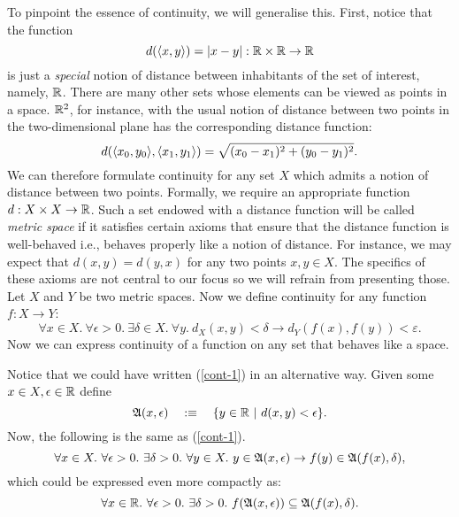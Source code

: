 To pinpoint the essence of continuity, we will generalise this. First, notice that the
function
\begin{equation*}
  d(\langle x , y \rangle) = | x - y | : \mathbb{R}{} \times \mathbb{R}{} \rightarrow \mathbb{R}{}
\end{equation*}
is just a \emph{special} notion of distance between inhabitants of the set of interest,
namely, $\mathbb{R}{}$. There are many other sets whose elements can be viewed as points in a
space. $\mathbb{R}{}^2$, for instance, with the usual notion of distance between two points in
the two-dimensional plane has the corresponding distance function:
\begin{equation*}
  d(\langle x_0 , y_0 \rangle , \langle x_1 , y_1 \rangle) = \sqrt{(x_0 - x_1)^2 + (y_0 - y_1)^2}.
\end{equation*}
We can therefore formulate continuity for any set $X$ which admits a notion of distance
between two points. Formally, we require an appropriate function $d : X \times X \rightarrow \mathbb{R}{}$.
Such a set endowed with a distance function will be called \emph{metric space} if it
satisfies certain axioms that ensure that the distance function is well-behaved i.e.,
behaves properly like a notion of distance. For instance, we may expect that $d(x, y) =
d(y, x)$ for any two points $x, y \in X$. The specifics of these axioms are not central to
our focus so we will refrain from presenting those. Let $X$ and $Y$ be two metric spaces.
Now we define continuity for any function $f : X \rightarrow Y$:
\begin{equation}\label{cont-1}
  \forall x \in X.~ \forall \epsilon > 0.~ \exists \delta \in X.~ \forall y.~ d_X(x, y) < δ \rightarrow d_Y(f(x), f(y)) < ε.
\end{equation}
Now we can express continuity of a function on any set that behaves like a space.

Notice that we could have written (\ref{cont-1}) in an alternative way. Given
some $x \in X, \epsilon \in \mathbb{R}{}$ define
\begin{equation*}
  \mathfrak{A}(x, \epsilon) \quad:\equiv\quad \{ y \in \mathbb{R}{}~|~d(x, y) < \epsilon \}.
\end{equation*}
Now, the following is the same as (\ref{cont-1}).
\begin{equation*}
  \forall x \in X.~ \forall \epsilon > 0.~ \exists \delta > 0.~ \forall y \in X.~ y \in \mathfrak{A}(x, \epsilon) \rightarrow f(y) \in \mathfrak{A}(f(x), \delta),
\end{equation*}
which could be expressed even more compactly as:
\begin{equation}\label{cont-2}
  \forall x \in \mathbb{R}{}.~ \forall \epsilon > 0.~ \exists \delta > 0.~ f(\mathfrak{A}(x, \epsilon)) \subseteq \mathfrak{A}(f(x), \delta).
\end{equation}

